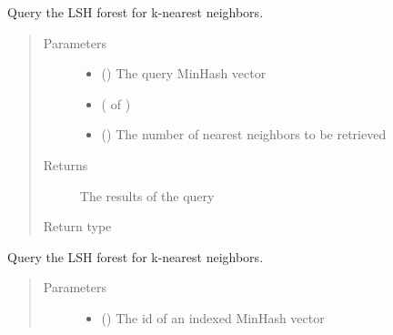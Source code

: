 \documentclass[letterpaper,10pt,english]{sphinxmanual}
\begin{document}
\begin{fulllineitems}
\begin{fulllineitems}
\end{fulllineitems}


\begin{fulllineitems}
\label{\detokenize{documentation:tmap.LSHForest.query_exclude}}
Query the LSH forest for k-nearest neighbors.
\begin{quote}\begin{description}
\item[{Parameters}] \leavevmode\begin{itemize}
\item {} 
 () \textendash{} The query MinHash vector

\item {} 
 ( of ) \textendash{} 

\item {} 
 () \textendash{} The number of nearest neighbors to be retrieved

\end{itemize}

\item[{Returns}] \leavevmode
The results of the query

\item[{Return type}] \leavevmode
{}

\end{description}\end{quote}

\end{fulllineitems}


\begin{fulllineitems}
\label{\detokenize{documentation:tmap.LSHForest.query_exclude_by_id}}
Query the LSH forest for k-nearest neighbors.
\begin{quote}\begin{description}
\item[{Parameters}] \leavevmode\begin{itemize}
\item {} 
 () \textendash{} The id of an indexed MinHash vector


\end{itemize}
\end{description}
\end{quote}
\end{fulllineitems}
\end{fulllineitems}
\end{document}
